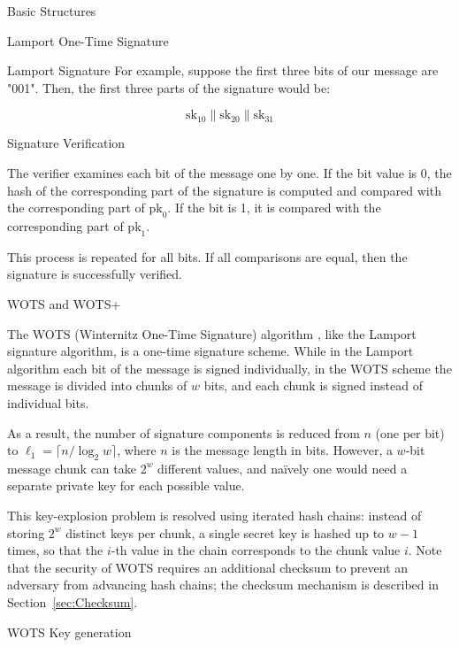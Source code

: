 \documentclass[version=preprint]{iacrcc}
\begin{document}
\begin{section}{Basic Structures}{\label{sec1}}
\begin{subsection}{Lamport One-Time Signature}
\begin{subsubsection}{Lamport Signature}
    For example, suppose the first three bits of our message are "001". Then, the first three parts of the signature would be:

    \[
    \text{sk}_{10} \| \text{sk}_{20} \| \text{sk}_{31}
    \]
    
\end{subsubsection}

\begin{subsubsection}{Signature Verification}

    The verifier examines each bit of the message one by one. If the bit value is 0, the hash of the corresponding part of the signature is computed and compared with the corresponding part of \(\text{pk}_0\). If the bit is 1, it is compared with the corresponding part of \(\text{pk}_1\).

    This process is repeated for all bits. If all comparisons are equal, then the signature is successfully verified.
    
\end{subsubsection}
    
\end{subsection}

\begin{subsection}{WOTS and WOTS+}

    The WOTS (Winternitz One-Time Signature) algorithm \cite{buchmann2013security}, like the Lamport signature algorithm, is a one-time signature scheme. While in the Lamport algorithm each bit of the message is signed individually, in the WOTS scheme the message is divided into chunks of \( w \) bits, and each chunk is signed instead of individual bits. 

    As a result, the number of signature components is reduced from $n$ (one per bit) to $\ell_1 = \lceil n / \log_2 w \rceil$, where $n$ is the message length in bits. However, a \( w \)-bit message chunk can take \( 2^w \) different values, and na\"ively one would need a separate private key for each possible value.

    This key-explosion problem is resolved using iterated hash chains: instead of storing $2^w$ distinct keys per chunk, a single secret key is hashed up to $w-1$ times, so that the $i$-th value in the chain corresponds to the chunk value $i$. Note that the security of WOTS requires an additional checksum to prevent an adversary from advancing hash chains; the checksum mechanism is described in Section~\ref{sec:Checksum}.

    \begin{subsubsection}{WOTS Key generation}


\end{subsubsection}
\end{subsection}
\end{section}
\end{document}
